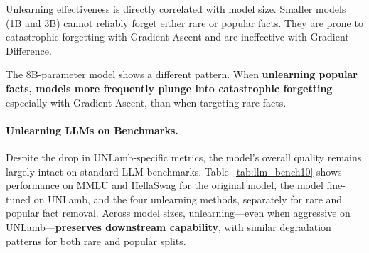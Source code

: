 Unlearning effectiveness is directly correlated with model size. Smaller models (1B and 3B) cannot reliably forget either rare or popular facts. They are prone to catastrophic forgetting with Gradient Ascent and are ineffective with Gradient Difference.

The 8B-parameter model shows a different pattern. When \textbf{unlearning popular facts, models more frequently plunge into catastrophic forgetting} especially with Gradient Ascent, than when targeting rare facts.




\paragraph{Unlearning LLMs on Benchmarks.}



Despite the drop in UNLamb-specific metrics, the model’s overall quality remains largely intact on standard LLM benchmarks. Table~\ref{tab:llm_bench10} shows performance on MMLU and HellaSwag for the original model, the model fine-tuned on UNLamb, and the four unlearning methods, separately for rare and popular fact removal. Across model sizes, unlearning—even when aggressive on UNLamb—\textbf{preserves downstream capability}, with similar degradation patterns for both rare and popular splits.








